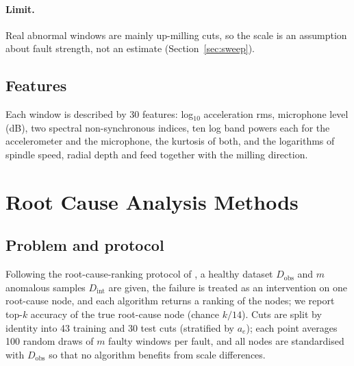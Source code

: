 \documentclass[11pt]{article}
\begin{document}
\paragraph{Limit.} Real abnormal windows are mainly up-milling cuts, so the scale is an assumption about fault strength, not an estimate (Section~\ref{sec:sweep}).

\subsection{Features}
Each window is described by 30 features: log$_{10}$ acceleration rms, microphone level (dB), two spectral non-synchronous indices, ten log band powers each for the accelerometer and the microphone, the kurtosis of both, and the logarithms of spindle speed, radial depth and feed together with the milling direction.

\section{Root Cause Analysis Methods}\label{sec:rca}
\subsection{Problem and protocol}
Following the root-cause-ranking protocol of \citet{lee2026brcd}, a healthy dataset $D_\text{obs}$ and $m$ anomalous samples $D_\text{int}$ are given, the failure is treated as an intervention on one root-cause node, and each algorithm returns a ranking of the nodes; we report top-$k$ accuracy of the true root-cause node (chance $k/14$). Cuts are split by identity into 43 training and 30 test cuts (stratified by $a_e$); each point averages 100 random draws of $m$ faulty windows per fault, and all nodes are standardised with $D_\text{obs}$ so that no algorithm benefits from scale differences.
\end{document}
